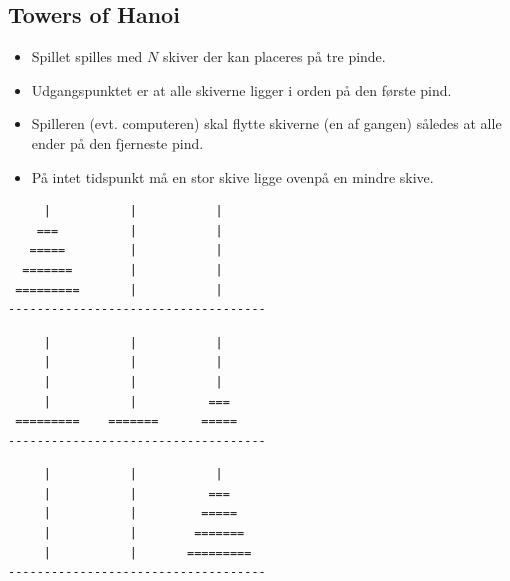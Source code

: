 \documentclass[rgb]{beamer}
\begin{document}
\subsection{Towers of Hanoi}
\begin{frame}[fragile]
\begin{footnotesize}


  \vspace{1ex}

  \begin{minipage}[b]{0.55\textwidth}
  \begin{itemize}
  \item Spillet spilles med $N$ skiver der kan placeres på tre
    pinde.
    \vspace{1ex}

  \item Udgangspunktet er at alle skiverne ligger i orden på den
    første pind.
    \vspace{1ex}

  \item Spilleren (evt. computeren) skal flytte skiverne (en af gangen)
    således at alle ender på den fjerneste pind.
    \vspace{1ex}

\item På intet tidspunkt må en stor skive ligge ovenpå en mindre
  skive.
  \end{itemize}
\end{minipage}\hfill\begin{minipage}[b]{0.4\textwidth}

\begin{tiny}
\begin{verbatim}
     |           |           |
    ===          |           |
   =====         |           |
  =======        |           |
 =========       |           |
------------------------------------
\end{verbatim}

\begin{verbatim}
     |           |           |
     |           |           |
     |           |           |
     |           |          ===
 =========    =======      =====
------------------------------------
\end{verbatim}

\begin{verbatim}
     |           |           |
     |           |          ===
     |           |         =====
     |           |        =======
     |           |       =========
------------------------------------
\end{verbatim}
\end{tiny}
\end{minipage}
\end{footnotesize}
\end{frame}
\end{document}

